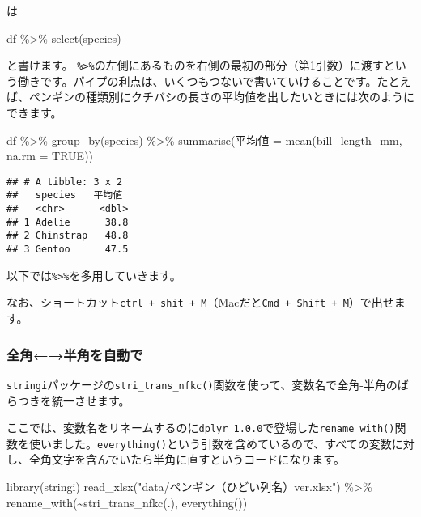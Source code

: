 \documentclass[
  xelatex,ja=standard, b5paper]{bxjsbook}
\newenvironment{Shaded}{\begin{snugshade}}{\end{snugshade}}
\newcommand{\AttributeTok}[1]{\textcolor[rgb]{0.77,0.63,0.00}{#1}}
\newcommand{\ConstantTok}[1]{\textcolor[rgb]{0.00,0.00,0.00}{#1}}
\newcommand{\FunctionTok}[1]{\textcolor[rgb]{0.00,0.00,0.00}{#1}}
\newcommand{\NormalTok}[1]{#1}
\newcommand{\OtherTok}[1]{\textcolor[rgb]{0.56,0.35,0.01}{#1}}
\newcommand{\SpecialCharTok}[1]{\textcolor[rgb]{0.00,0.00,0.00}{#1}}
\newcommand{\StringTok}[1]{\textcolor[rgb]{0.31,0.60,0.02}{#1}}
\begin{document}
は

\begin{Shaded}
\begin{Highlighting}[]
\NormalTok{df }\SpecialCharTok{\%\textgreater{}\%} \FunctionTok{select}\NormalTok{(species)}
\end{Highlighting}
\end{Shaded}

と書けます。 \texttt{\%\textgreater{}\%}の左側にあるものを右側の最初の部分（第1引数）に渡すという働きです。パイプの利点は、いくつもつないで書いていけることです。たとえば、ペンギンの種類別にクチバシの長さの平均値を出したいときには次のようにできます。

\begin{Shaded}
\begin{Highlighting}[]
\NormalTok{df }\SpecialCharTok{\%\textgreater{}\%} 
  \FunctionTok{group\_by}\NormalTok{(species) }\SpecialCharTok{\%\textgreater{}\%} 
  \FunctionTok{summarise}\NormalTok{(平均値 }\OtherTok{=} \FunctionTok{mean}\NormalTok{(bill\_length\_mm, }\AttributeTok{na.rm =} \ConstantTok{TRUE}\NormalTok{))}
\end{Highlighting}
\end{Shaded}

\begin{verbatim}
## # A tibble: 3 x 2
##   species   平均値
##   <chr>      <dbl>
## 1 Adelie      38.8
## 2 Chinstrap   48.8
## 3 Gentoo      47.5
\end{verbatim}

以下では\texttt{\%\textgreater{}\%}を多用していきます。

なお、ショートカット\texttt{ctrl\ +\ shit\ +\ M}（Macだと\texttt{Cmd\ +\ Shift\ +\ M}）で出せます。

\hypertarget{ux5168ux89d2ux534aux89d2ux3092ux81eaux52d5ux3067}{%
\subsubsection{全角←→半角を自動で}\label{ux5168ux89d2ux534aux89d2ux3092ux81eaux52d5ux3067}}

\texttt{stringi}パッケージの\texttt{stri\_trans\_nfkc()}関数を使って、変数名で全角-半角のばらつきを統一させます。

ここでは、変数名をリネームするのに\texttt{dplyr\ 1.0.0}で登場した\texttt{rename\_with()}関数を使いました。\texttt{everything()}という引数を含めているので、すべての変数に対し、全角文字を含んでいたら半角に直すというコードになります。

\begin{Shaded}
\begin{Highlighting}[]
\FunctionTok{library}\NormalTok{(stringi)}
\FunctionTok{read\_xlsx}\NormalTok{(}\StringTok{"data/ペンギン（ひどい列名）ver.xlsx"}\NormalTok{) }\SpecialCharTok{\%\textgreater{}\%} 
  \FunctionTok{rename\_with}\NormalTok{(}\SpecialCharTok{\textasciitilde{}}\FunctionTok{stri\_trans\_nfkc}\NormalTok{(.),}
              \FunctionTok{everything}\NormalTok{())}
\end{Highlighting}
\end{Shaded}
\end{document}
